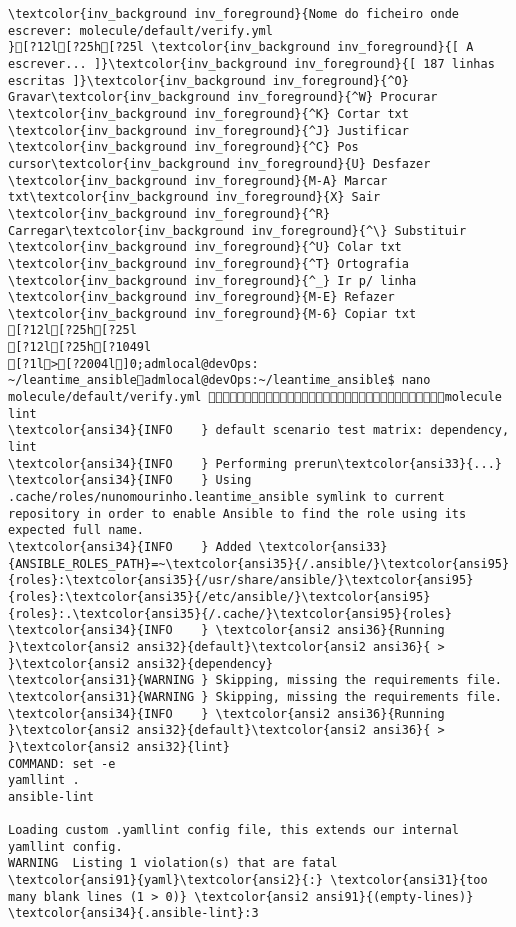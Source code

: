 \documentclass{scrartcl}
\begin{document}
\begin{Verbatim}
\textcolor{inv_background inv_foreground}{Nome do ficheiro onde escrever: molecule/default/verify.yml                                                                               }[?12l[?25h[?25l \textcolor{inv_background inv_foreground}{[ A escrever... ]}\textcolor{inv_background inv_foreground}{[ 187 linhas escritas ]}\textcolor{inv_background inv_foreground}{^O} Gravar\textcolor{inv_background inv_foreground}{^W} Procurar      \textcolor{inv_background inv_foreground}{^K} Cortar txt    \textcolor{inv_background inv_foreground}{^J} Justificar    \textcolor{inv_background inv_foreground}{^C} Pos cursor\textcolor{inv_background inv_foreground}{U} Desfazer     \textcolor{inv_background inv_foreground}{M-A} Marcar txt\textcolor{inv_background inv_foreground}{X} Sair    \textcolor{inv_background inv_foreground}{^R} Carregar\textcolor{inv_background inv_foreground}{^\} Substituir    \textcolor{inv_background inv_foreground}{^U} Colar txt     \textcolor{inv_background inv_foreground}{^T} Ortografia    \textcolor{inv_background inv_foreground}{^_} Ir p/ linha   \textcolor{inv_background inv_foreground}{M-E} Refazer      \textcolor{inv_background inv_foreground}{M-6} Copiar txt
[?12l[?25h[?25l
[?12l[?25h[?1049l
[?1l>[?2004l]0;admlocal@devOps: ~/leantime_ansibleadmlocal@devOps:~/leantime_ansible$ nano molecule/default/verify.yml molecule lint
\textcolor{ansi34}{INFO    } default scenario test matrix: dependency, lint
\textcolor{ansi34}{INFO    } Performing prerun\textcolor{ansi33}{...}
\textcolor{ansi34}{INFO    } Using .cache/roles/nunomourinho.leantime_ansible symlink to current repository in order to enable Ansible to find the role using its expected full name.
\textcolor{ansi34}{INFO    } Added \textcolor{ansi33}{ANSIBLE_ROLES_PATH}=~\textcolor{ansi35}{/.ansible/}\textcolor{ansi95}{roles}:\textcolor{ansi35}{/usr/share/ansible/}\textcolor{ansi95}{roles}:\textcolor{ansi35}{/etc/ansible/}\textcolor{ansi95}{roles}:.\textcolor{ansi35}{/.cache/}\textcolor{ansi95}{roles}
\textcolor{ansi34}{INFO    } \textcolor{ansi2 ansi36}{Running }\textcolor{ansi2 ansi32}{default}\textcolor{ansi2 ansi36}{ > }\textcolor{ansi2 ansi32}{dependency}
\textcolor{ansi31}{WARNING } Skipping, missing the requirements file.
\textcolor{ansi31}{WARNING } Skipping, missing the requirements file.
\textcolor{ansi34}{INFO    } \textcolor{ansi2 ansi36}{Running }\textcolor{ansi2 ansi32}{default}\textcolor{ansi2 ansi36}{ > }\textcolor{ansi2 ansi32}{lint}
COMMAND: set -e
yamllint .
ansible-lint

Loading custom .yamllint config file, this extends our internal yamllint config.
WARNING  Listing 1 violation(s) that are fatal
\textcolor{ansi91}{yaml}\textcolor{ansi2}{:} \textcolor{ansi31}{too many blank lines (1 > 0)} \textcolor{ansi2 ansi91}{(empty-lines)}
\textcolor{ansi34}{.ansible-lint}:3


\end{Verbatim}
\end{document}
